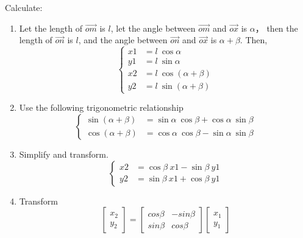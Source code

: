 \documentclass{article} %
\numberwithin{equation}{section} %
\begin{document}
Calculate:
\begin{enumerate}

\item Let the length of $\overrightarrow{om}$ is $l$, 
let the angle between $\overrightarrow{om}$ and $\overrightarrow{ox}$ is $\alpha$，
then the length of $\overrightarrow{on}$ is $l$, 
and the angle between $\overrightarrow{on}$ and $\overrightarrow{ox}$ is $\alpha+\beta$.
Then,
\begin{equation*}
\left\{\begin{array}{rl}
x1 &= l~\cos\alpha\\
y1 &= l~\sin\alpha\\
x2 &= l~\cos{(\alpha+\beta)}\\
y2 &= l~\sin{(\alpha+\beta)}
\end{array}\right.
\end{equation*}

\item Use the following trigonometric relationship
\begin{equation*}
\left\{\begin{array}{rl}
\sin{(\alpha+\beta)}& = \sin\alpha~\cos\beta + \cos\alpha~\sin\beta\\
\cos{(\alpha+\beta)}& = \cos\alpha~\cos\beta - \sin\alpha~\sin\beta
\end{array}\right.
\end{equation*}

\item Simplify and transform.
\begin{equation}\label{2d_rotation_matrix_anticlockwise_eq3}
\left\{\begin{array}{rl}
x2 &= \cos\beta~x1 - \sin\beta~y1\\
y2 &= \sin\beta~x1 + \cos\beta~y1
\end{array}\right.
\end{equation}

\item Transform
\begin{equation*}
\begin{bmatrix}x_2\\y_2\end{bmatrix}=
\begin{bmatrix}cos\beta & -sin\beta \\sin\beta & cos\beta \end{bmatrix}
\begin{bmatrix}x_1\\y_1\end{bmatrix}
\end{equation*}


\end{enumerate}
\end{document}
